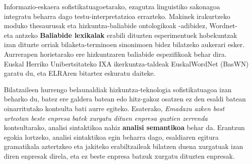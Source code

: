 \begin{multicols}{2}
Informazio-eskaera sofistikatuagoetarako, ezagutza linguistiko sakonagoa integratu beharra dago testu-interpretatzioa errazteko. Makinek irakurtzeko moduko thesaurusak eta hizkuntza-baliabide ontologikoak -adibidez, Wordnet- eta antzeko \textbf{Baliabide lexikalak} erabili dituzten esperimentuek hobekuntzak izan dituzte orriak bilaketa-terminoen sinonimoen bidez bilatzeko aukerari esker. Aurrerapen horietarako ere hizkuntzaren baliabide espezifikoak behar dira. Euskal Herriko Unibertsitateko IXA ikerkuntza-taldeak EuskalWordNet (BasWN) garatu du, eta ELRAren bitartez eskuratu daiteke.


Bilatzaileen hurrengo belaunaldiak hizkuntza-teknologia sofistikatuagoa izan beharko du, batez ere galdera batean edo hitz-gakoz osatzen ez den esaldi batean oinarritutako kontsulta bati aurre egiteko. Esaterako, \textit{Emadazu azken bost urteotan beste enpresa batek xurgatu dituen enpresa guztien zerrenda} kontsultarako, analisi sintaktikoa nahiz \textbf{analisi semantikoa} behar da. Erantzun egokia lortzeko, analisi sintaktikoa egin beharra dago, esaldiaren egitura gramatikala aztertzkeo eta jakiteko erabiltzaileak bilatzen duena xurgatuak izan diren enpresak direla, eta ez beste enpresa batzuk xurgatu dituzten enpresak.


\end{multicols}

